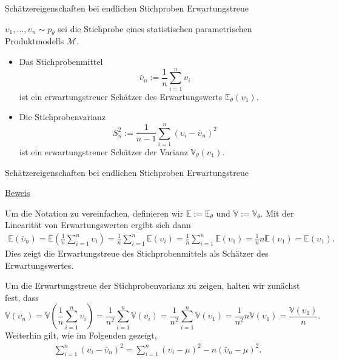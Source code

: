 \documentclass[
  8pt,
  ignorenonframetext,
]{beamer}
\newcommand{\ups} {\upsilon}
\begin{document}
\begin{frame}{\small Schätzereigenschaften bei endlichen Stichproben
\textbar{} Erwartungstreue}
\protect\hypertarget{schuxe4tzereigenschaften-bei-endlichen-stichproben-erwartungstreue-1}{}
\small
\begin{theorem}
\justifying
\normalfont
$\ups_1,...,\ups_n \sim p_\theta$ sei die Stichprobe eines statistischen parametrischen Produktmodells $\mathcal{M}$.
\begin{itemize}
\item Das Stichprobenmittel
\begin{equation}
\bar{\ups}_n := \frac{1}{n}\sum_{i=1}^n \ups_i
\end{equation}
ist ein erwartungstreuer Schätzer des Erwartungswerts $\mathbb{E}_\theta(\ups_1)$.
\vspace{1mm}
\item Die Stichprobenvarianz
\begin{equation}
S^2_n := \frac{1}{n-1}\sum_{i=1}^n (\ups_i - \bar{\ups}_n)^2
\end{equation}
ist ein erwartungstreuer Schätzer der Varianz $\mathbb{V}_\theta(\ups_1)$.
\end{itemize}
\end{theorem}
\end{frame}

\begin{frame}{\small Schätzereigenschaften bei endlichen Stichproben
\textbar{} Erwartungstreue}
\protect\hypertarget{schuxe4tzereigenschaften-bei-endlichen-stichproben-erwartungstreue-2}{}
\footnotesize

\underline{Beweis}

Um die Notation zu vereinfachen, definieren wir
\(\mathbb{E} := \mathbb{E}_\theta\) und
\(\mathbb{V} := \mathbb{V}_\theta\). Mit der Linearität von
Erwartungswerten ergibt sich dann \begin{align*}
\mathbb{E}(\bar{\ups}_n)
= \mathbb{E} \left(\frac{1}{n}\sum_{i=1}^n  \ups_i \right)
= \frac{1}{n}\sum_{i=1}^n  \mathbb{E}\left( \ups_i \right)
= \frac{1}{n}\sum_{i=1}^n  \mathbb{E}\left( \ups_1 \right)
= \frac{1}{n} n  \mathbb{E}\left( \ups_1 \right)
=  \mathbb{E}\left( \ups_1 \right).
\end{align*} Dies zeigt die Erwartungstreue des Stichprobenmittels als
Schätzer des Erwartungswertes.

Um die Erwartungstreue der Stichprobenvarianz zu zeigen, halten wir
zunächst fest, dass \begin{equation*}
\mathbb{V}(\bar{\ups}_n)
= \mathbb{V}\left(\frac{1}{n} \sum_{i=1}^n \ups_i \right)
= \frac{1}{n^2} \sum_{i=1}^n \mathbb{V}\left( \ups_i \right)
= \frac{1}{n^2} \sum_{i=1}^n  \mathbb{V}\left( \ups_1 \right)
= \frac{1}{n^2} n \mathbb{V}\left( \ups_1 \right)
= \frac{\mathbb{V}\left( \ups_1 \right)}{n}.
\end{equation*} Weiterhin gilt, wie im Folgenden gezeigt, \begin{align*}
\sum_{i=1}^n \left(\ups_i - \bar{\ups}_n\right)^2 = \sum_{i=1}^n (\ups_i - \mu)^2 - n(\bar{\ups}_n - \mu)^2.
\end{align*}
\end{frame}
\end{document}

